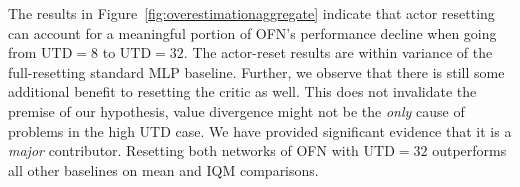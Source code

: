 The results in Figure~\ref{fig:overestimationaggregate} indicate that actor resetting can account for a meaningful portion of OFN's performance decline when going from $\mathrm{UTD}=8$ to $\mathrm{UTD}=32$. The actor-reset results are within variance of the full-resetting standard MLP baseline. Further, we observe that there is still some additional benefit to resetting the critic as well. 
This does not invalidate the premise of our hypothesis, value divergence might not be the \emph{only} cause of problems in the high UTD case. We have provided significant evidence that it is a \emph{major} contributor.
Resetting both networks of OFN with $\mathrm{UTD}=32$  outperforms all other baselines on mean and IQM comparisons. %



